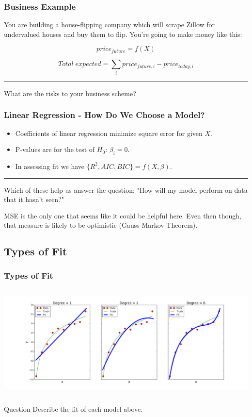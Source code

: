 \documentclass{beamer}
\begin{document}
\begin{frame}
  \frametitle{Business Example}
  You are building a house-flipping company which will scrape Zillow for
  undervalued houses and buy them to flip. You're going to make money like this:

  $$ price_{future} = f(X) $$

  $$ Total\; expected = \sum_i price_{future,i} - price_{today,i} $$ 
  \pause

  \noindent\hfil\rule{\textwidth}{.4pt}\hfil \vspace{3mm}

  \centering
  What are the risks to your business scheme?
\end{frame}

\begin{frame}
  \frametitle{Linear Regression - How Do We Choose a Model?}
  \begin{itemize}
    \item Coefficients of linear regression minimize square error for given $X$.
    \item P-values are for the test of $H_0$: $\beta_i=0$.
    \item In assessing fit we have $\{R^2, AIC, BIC\} = f(X, \beta)$.
  \end{itemize}

  \noindent\hfil\rule{\textwidth}{.4pt}\hfil \vspace{3mm}
  \pause

  Which of these help us answer the question: "How will my model perform on data that it hasn't seen?" \vspace{2mm} \pause

  MSE is the only one that seems like it could be helpful here. Even then though, that measure is likely to be optimistic (Gauss-Markov Theorem).
\end{frame}

\subsection{Types of Fit}
\begin{frame}
  \frametitle{Types of Fit}
  \begin{columns}
    \begin{center}
      \includegraphics[width=\textwidth]{images/overfitting.png}
    \end{center}
  \end{columns} \pause

  \begin{block}{Question}
    Describe the fit of each model above.
  \end{block}
\end{frame}
\end{document}
